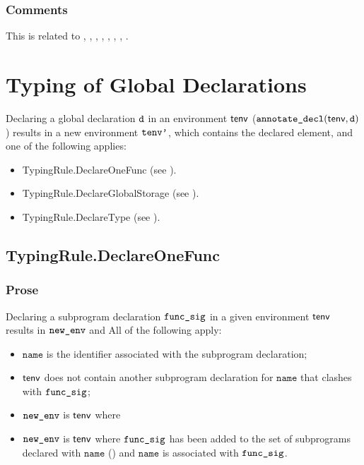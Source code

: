 \documentclass{book}
\newcommand\declaredecl[1]{\texttt{annotate\_decl}(#1)}
\newcommand\name[0]{\texttt{name}}
\begin{document}
\subsection{Comments}
This is related to , , , ,
, , , .

\chapter{Typing of Global Declarations}

Declaring a global declaration $\texttt{d}$ in an environment $\textsf{tenv}$ ($\declaredecl{\tenv, \vd}$)
results in a new environment $\texttt{tenv'}$, which contains the declared element, and one of the following applies:
\begin{itemize}
  \item TypingRule.DeclareOneFunc (see ).
  \item TypingRule.DeclareGlobalStorage (see ).
  \item TypingRule.DeclareType (see ).
\end{itemize}

\section{TypingRule.DeclareOneFunc \label{sec:TypingRule.DeclareOneFunc}}
\subsection{Prose}
Declaring a subprogram declaration $\texttt{func\_sig}$ in a given environment $\textsf{tenv}$ results
in $\texttt{new\_env}$ and All of the following apply:
\begin{itemize}
  \item $\name$ is the identifier associated with the subprogram declaration;
  \item $\textsf{tenv}$ does not contain another subprogram declaration for $\name$ that clashes with $\texttt{func\_sig}$;
  \item $\texttt{new\_env}$ is $\textsf{tenv}$ where
  \item $\texttt{new\_env}$ is $\textsf{tenv}$ where
  $\texttt{func\_sig}$ has been added to the set of subprograms declared with $\name$ (\subprogramrenamings)
  and $\name$ is associated with $\texttt{func\_sig}$.
\end{itemize}
\end{document}
